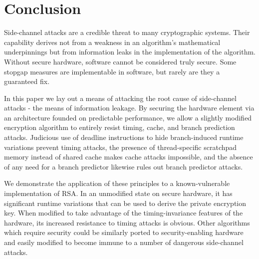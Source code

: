 \documentclass[times, 10pt,twocolumn]{article}
\begin{document}
\section{Conclusion}
Side-channel attacks are a credible threat to many cryptographic systems.  Their capability derives not from a weakness in an algorithm's mathematical underpinnings but from information leaks in the implementation of the algorithm.  Without secure hardware, software cannot be considered truly secure.  Some stopgap measures are implementable in software, but rarely are they a guaranteed fix.

In this paper we lay out a means of attacking the root cause of side-channel attacks - the means of information leakage.  By securing the hardware element via an architecture founded on predictable performance, we allow a slightly modified encryption algorithm to entirely resist timing, cache, and branch prediction attacks.  Judicious use of deadline instructions to hide branch-induced runtime variations prevent timing attacks, the presence of thread-specific scratchpad memory instead of shared cache makes cache attacks impossible, and the absence of any need for a branch predictor likewise rules out branch predictor attacks.

We demonstrate the application of these principles to a known-vulnerable implementation of RSA.  In an unmodified state on secure hardware, it has significant runtime variations that can be used to derive the private encryption key.  When modified to take advantage of the timing-invariance features of the hardware, its increased resistance to timing attacks is obvious.  Other algorithms which require security could be similarly ported to security-enabling hardware and easily modified to become immune to a number of dangerous side-channel attacks.




\end{document}
